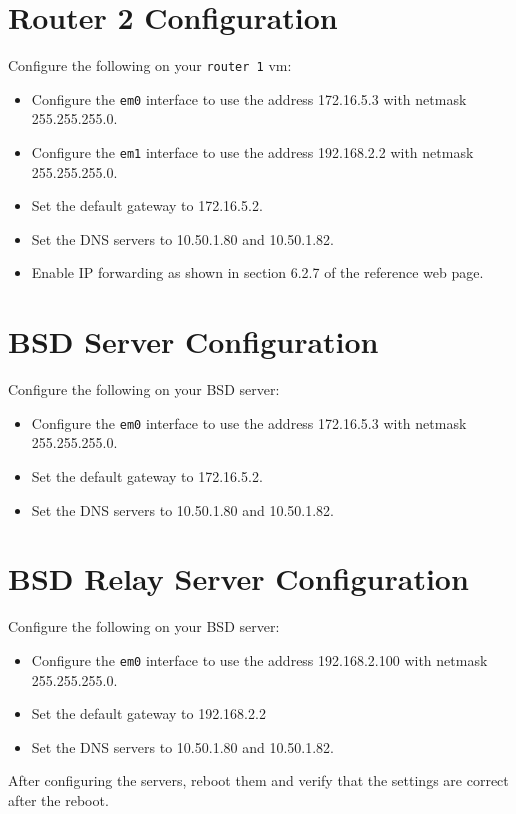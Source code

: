 \documentclass{article}
\begin{document}
\section{Router 2 Configuration}
Configure the following on your \texttt{router 1} vm:

\begin{itemize}
	\item Configure the \texttt{em0} interface to use the address 172.16.5.3 with netmask 255.255.255.0.
	\item Configure the \texttt{em1} interface to use the address 192.168.2.2 with netmask 255.255.255.0.
	\item Set the default gateway to 172.16.5.2.
	\item Set the DNS servers to 10.50.1.80 and 10.50.1.82.
	\item Enable IP forwarding as shown in section 6.2.7 of the reference web page.
\end{itemize}

\section{BSD Server Configuration}
Configure the following on your BSD server:

\begin{itemize}
	\item Configure the \texttt{em0} interface to use the address 172.16.5.3 with netmask 255.255.255.0.
	\item Set the default gateway to 172.16.5.2.
	\item Set the DNS servers to 10.50.1.80 and 10.50.1.82.
\end{itemize}

\section{BSD Relay Server Configuration}
Configure the following on your BSD server:

\begin{itemize}
	\item Configure the \texttt{em0} interface to use the address 192.168.2.100 with netmask 255.255.255.0.
	\item Set the default gateway to 192.168.2.2
	\item Set the DNS servers to 10.50.1.80 and 10.50.1.82.
\end{itemize}


After configuring the servers, reboot them and verify that the settings are correct after the reboot.
\end{document}
